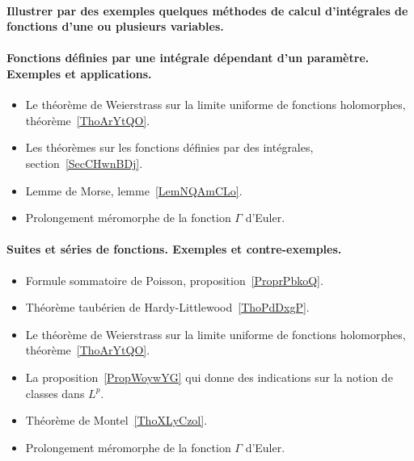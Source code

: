 \paragraph{Illustrer par des exemples quelques méthodes de calcul d'intégrales de fonctions d’une ou plusieurs variables.}
\paragraph{Fonctions définies par une intégrale dépendant d’un paramètre. Exemples et applications.}
\begin{itemize}
    \item Le théorème de Weierstrass sur la limite uniforme de fonctions holomorphes, théorème~\ref{ThoArYtQO}.
    \item Les théorèmes sur les fonctions définies par des intégrales, section~\ref{SecCHwnBDj}.
    \item Lemme de Morse, lemme~\ref{LemNQAmCLo}.
    \item Prolongement méromorphe de la fonction \( \Gamma\) d'Euler.
\end{itemize}
\paragraph{Suites et séries de fonctions. Exemples et contre-exemples.}
\begin{itemize}
    \item Formule sommatoire de Poisson, proposition~\ref{ProprPbkoQ}.
    \item Théorème taubérien de Hardy-Littlewood~\ref{ThoPdDxgP}.
    \item Le théorème de Weierstrass sur la limite uniforme de fonctions holomorphes, théorème~\ref{ThoArYtQO}.
    \item La proposition~\ref{PropWoywYG} qui donne des indications sur la notion de classes dans \( L^p\).
    \item Théorème de Montel~\ref{ThoXLyCzol}.
    \item Prolongement méromorphe de la fonction \( \Gamma\) d'Euler.
\end{itemize}
